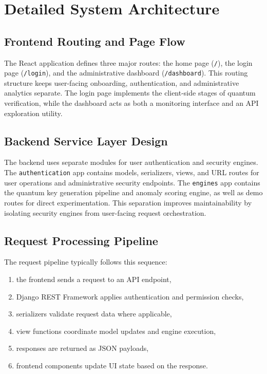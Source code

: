 \documentclass[12pt,a4paper]{report}
\begin{document}
\section{Detailed System Architecture}

\subsection{Frontend Routing and Page Flow}
The React application defines three major routes: the home page (\texttt{/}), the login page (\texttt{/login}), and the administrative dashboard (\texttt{/dashboard}). This routing structure keeps user-facing onboarding, authentication, and administrative analytics separate. The login page implements the client-side stages of quantum verification, while the dashboard acts as both a monitoring interface and an API exploration utility.

\subsection{Backend Service Layer Design}
The backend uses separate modules for user authentication and security engines. The \texttt{authentication} app contains models, serializers, views, and URL routes for user operations and administrative security endpoints. The \texttt{engines} app contains the quantum key generation pipeline and anomaly scoring engine, as well as demo routes for direct experimentation. This separation improves maintainability by isolating security engines from user-facing request orchestration.

\subsection{Request Processing Pipeline}
The request pipeline typically follows this sequence:

\begin{enumerate}
    \item the frontend sends a request to an API endpoint,
    \item Django REST Framework applies authentication and permission checks,
    \item serializers validate request data where applicable,
    \item view functions coordinate model updates and engine execution,
    \item responses are returned as JSON payloads,
    \item frontend components update UI state based on the response.
\end{enumerate}
\end{document}
